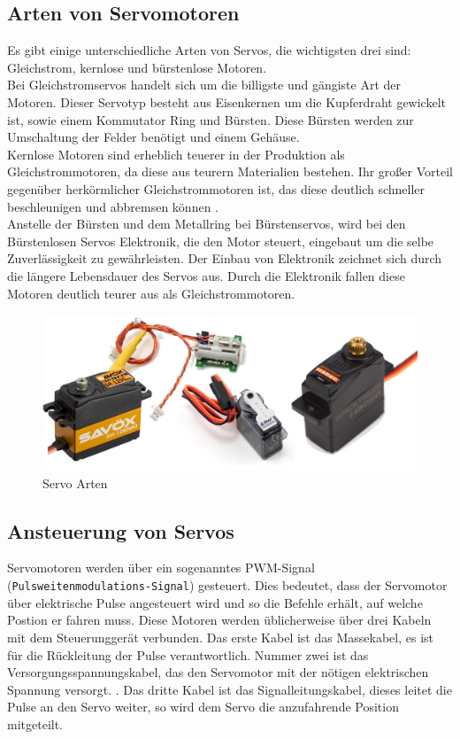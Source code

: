\subsection{Arten von Servomotoren}
Es gibt einige unterschiedliche Arten von Servos, die wichtigsten drei sind: Gleichstrom, kernlose und bürstenlose Motoren. \\
Bei Gleichstromservos handelt sich um die billigste und gängiste Art der Motoren. Dieser Servotyp besteht aus Eisenkernen um die Kupferdraht gewickelt ist, sowie einem Kommutator Ring und Bürsten. Diese Bürsten werden zur Umschaltung der Felder benötigt und einem Gehäuse. \\
Kernlose Motoren sind erheblich teuerer in der Produktion als Gleichstrommotoren, da diese aus teurern Materialien bestehen. Ihr großer Vorteil gegenüber herkörmlicher Gleichstrommotoren ist, das diese deutlich schneller beschleunigen und abbremsen können \parencite{ServomotorArten}. \\
Anstelle der Bürsten und dem Metallring bei Bürstenservos, wird bei den Bürstenlosen Servos Elektronik, die den Motor steuert, eingebaut um die selbe Zuverlässigkeit zu gewährleisten. Der Einbau von Elektronik zeichnet sich durch die längere Lebensdauer des Servos aus. Durch die Elektronik fallen diese Motoren deutlich teurer aus als Gleichstrommotoren. \\

\begin{figure}[H]
	\centering
	\includegraphics[width=0.5\linewidth]{images/ServoArten.jpg}
	\caption[Servo Arten]{Servo Arten}
	\label{fig:Servo Arten}
\end{figure}


\newpage
\subsection{Ansteuerung von Servos}
Servomotoren werden über ein sogenanntes PWM-Signal (\texttt{Pulsweitenmodulations-Signal}) gesteuert. Dies bedeutet, dass der Servomotor über elektrische Pulse angesteuert wird und so die Befehle erhält, auf welche Postion er fahren muss. Diese Motoren werden üblicherweise über drei Kabeln mit dem Steuerunggerät verbunden. Das erste Kabel ist das Massekabel, es ist für die Rückleitung der Pulse verantwortlich. Nummer zwei ist das Versorgungsspannungskabel, das den Servomotor mit der nötigen elektrischen Spannung versorgt. \parencite{ServomotorAnsteuerung}. Das dritte Kabel ist das Signalleitungskabel, dieses  leitet die Pulse an den Servo weiter, so wird dem Servo die anzufahrende Position mitgeteilt.\\


